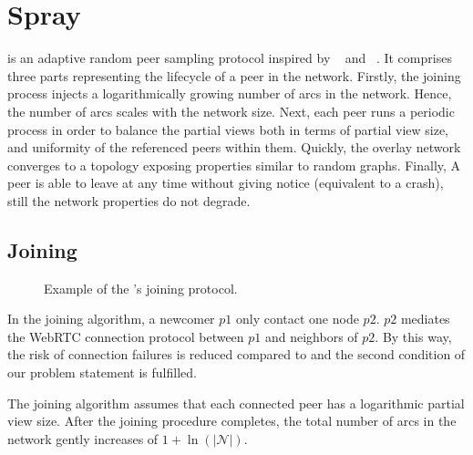 
\section{Spray}
\label{sec:proposal}

\SPRAY{} is an adaptive random peer sampling protocol inspired by
\SCAMP{}~\cite{ganesh2003peer} and
\CYCLON{}~\cite{voulgaris2005cyclon}. It comprises three parts
representing the lifecycle of a peer in the network.  Firstly, the
joining process injects a logarithmically growing number of arcs in
the network. Hence, the number of arcs scales with the network size.
Next, each peer runs a periodic process in order to balance the
partial views both in terms of partial view size, and uniformity of
the referenced peers within them. Quickly, the overlay network
converges to a topology exposing properties similar to random
graphs. Finally, A peer is able to leave at any time without giving
notice (equivalent to a crash), still the network properties do not
degrade.

\subsection{Joining}

\begin{figure*}
  \centering
  \hspace{40pt}
  \hspace{40pt}
  \caption{\label{fig:joiningexample}Example of the \SPRAY{}'s joining
    protocol.}
\end{figure*}


In the \SPRAY{} joining algorithm, a newcomer $p1$ only contact one
node $p2$. $p2$ mediates the WebRTC connection protocol between $p1$
and neighbors of $p2$. By this way, the risk of connection failures is
reduced compared to \SCAMP{} and the second condition of our problem
statement is fulfilled.

The \SPRAY{} joining algorithm assumes that each connected peer has a
logarithmic partial view size. After the joining procedure completes,
the total number of arcs in the network gently increases of
$1+\ln(|\mathcal{N}|)$.

